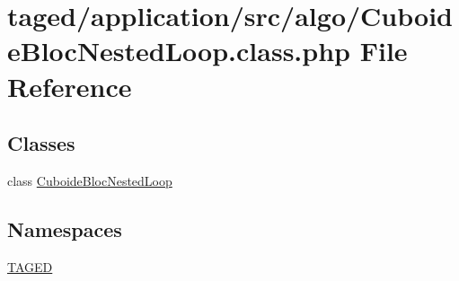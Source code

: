 \hypertarget{_cuboide_bloc_nested_loop_8class_8php}{}\section{taged/application/src/algo/\+Cuboide\+Bloc\+Nested\+Loop.class.\+php File Reference}
\label{_cuboide_bloc_nested_loop_8class_8php}
\subsection*{Classes}
\begin{DoxyCompactItemize}
\item 
class \hyperlink{class_cuboide_bloc_nested_loop}{Cuboide\+Bloc\+Nested\+Loop}
\end{DoxyCompactItemize}
\subsection*{Namespaces}
\begin{DoxyCompactItemize}
\item 
 \hyperlink{namespace_t_a_g_e_d}{T\+A\+G\+ED}
\end{DoxyCompactItemize}
